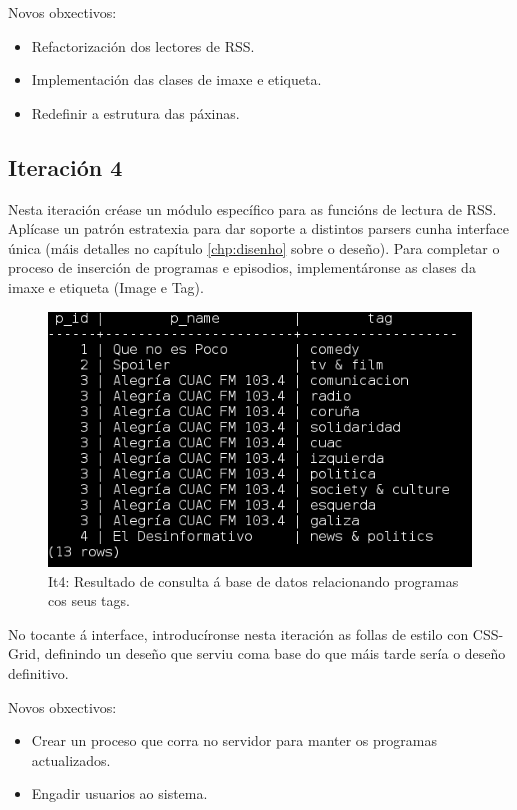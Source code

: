Novos obxectivos:

\begin{itemize}
	\item Refactorización dos lectores de RSS.
	\item Implementación das clases de imaxe e etiqueta.
	\item Redefinir a estrutura das páxinas. 
\end{itemize}


\subsection{Iteración 4}

Nesta iteración créase un módulo específico para as funcións de lectura de RSS. Aplícase un patrón estratexia para dar soporte a distintos parsers cunha interface única (máis detalles no capítulo \ref{chp:disenho} sobre o deseño). Para completar o proceso de inserción de programas e episodios, implementáronse as clases da imaxe e etiqueta (Image e Tag).

\begin{figure}[h]
	\centering
	\includegraphics[scale=0.6,keepaspectratio=true]{./images/tags.png}
	\caption{It4: Resultado de consulta á base de datos relacionando programas cos seus tags.}
	\label{fig:it4_tag}
\end{figure}

No tocante á interface, introducíronse nesta iteración as follas de estilo con CSS-Grid, definindo un deseño que serviu coma base do que máis tarde sería o deseño definitivo.

Novos obxectivos:

\begin{itemize}
	\item Crear un proceso que corra no servidor para manter os programas actualizados.
	\item Engadir usuarios ao sistema. 
\end{itemize}


